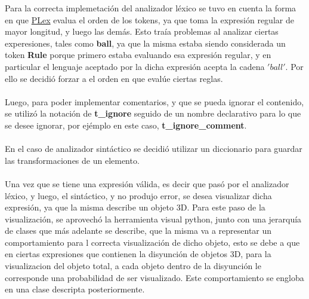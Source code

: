 Para la correcta implemetaci\'on del analizador l\'exico se tuvo en cuenta la forma en que \href{http://www.dabeaz.com/ply/ply.html#ply_nn3}{PLex} evalua el orden de los tokens, ya que toma la expresi\'on regular de mayor longitud, y luego las dem\'as. Esto tra\'ia problemas al analizar ciertas experesiones, tales como \textbf{ball}, ya que la misma estaba siendo considerada un token \textbf{Rule} porque primero estaba evaluando esa expresi\'on regular, y en particular el lenguaje aceptado por la dicha expresi\'on acepta la cadena $'ball'$. Por ello se decidi\'o forzar a el orden en que eval\'ue ciertas reglas.
\\
\\
Luego, para poder implementar comentarios, y que se pueda ignorar el contenido, se utiliz\'o la notaci\'on de \textbf{t\_ignore} seguido de un nombre declarativo para lo que se desee ignorar, por ej\'emplo en este caso, \textbf{t\_ignore\_comment}.
\\
\\
En el caso de analizador sint\'actico se decidi\'o utilizar un diccionario para guardar las transformaciones de un elemento.
\\
\\
Una vez que se tiene una expresi\'on v\'alida, es decir que pas\'o por el analizador l\'exico, y luego, el sint\'actico, y no produjo error, se desea visualizar dicha expresi\'on, ya que la misma describe un objeto 3D. Para este paso de la visualizaci\'on, se aprovech\'o la herramienta visual python, junto con una jerarqu\'ia de clases que m\'as adelante se describe, que la misma va a representar un comportamiento para l correcta visualizaci\'on de dicho objeto, esto se debe a que en ciertas expresiones que contienen la disyunci\'on de objetos 3D, para la visualizacion del objeto total, a cada objeto dentro de la disyunci\'on le corresponde una probabilidad de ser visualizado. Este comportamiento se engloba en una clase descripta posteriormente.


